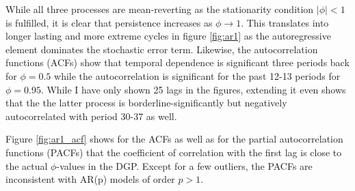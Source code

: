 While all three processes are mean-reverting as the stationarity condition $|\phi|<1$ is fulfilled, it is clear that persistence increases as $\phi\rightarrow1$. This translates into longer lasting and more extreme cycles in figure \ref{fig:ar1} as the autoregressive element dominates the stochastic error term. Likewise, the autocorrelation functions (ACFs) show that temporal dependence is significant three periods back for $\phi=0.5$ while the autocorrelation is significant for the past 12-13 periods for $\phi=0.95$. While I have only shown 25 lags in the figures, extending it even shows that the the latter process is borderline-significantly but negatively autocorrelated with period 30-37 as well.

Figure \ref{fig:ar1_acf} shows for the ACFs as well as for the partial autocorrelation functions (PACFs) that the coefficient of correlation with the first lag is close to the actual $\phi$-values in the DGP. Except for a few outliers, the PACFs are inconsistent with AR(p) models of order $p>1$.

